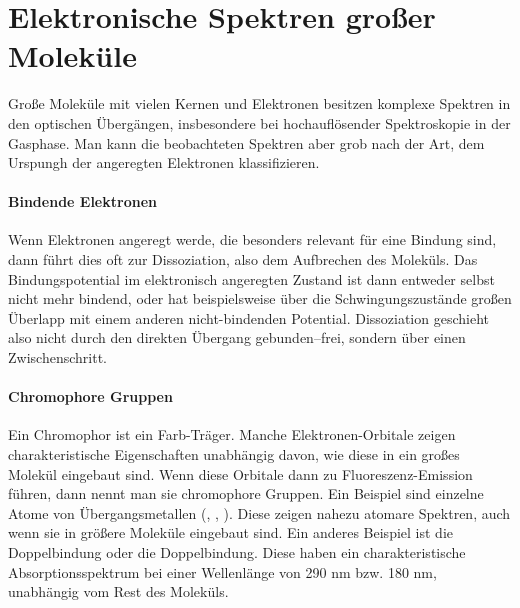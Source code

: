 
\section{Elektronische Spektren großer Moleküle}

Große Moleküle mit vielen Kernen und Elektronen besitzen komplexe Spektren in den optischen Übergängen, insbesondere bei hochauflösender Spektroskopie in der Gasphase. Man kann die beobachteten Spektren aber grob nach der Art, dem Urspungh der angeregten Elektronen klassifizieren.

\paragraph{Bindende Elektronen} Wenn Elektronen angeregt werde, die besonders relevant für eine Bindung sind, dann führt dies oft zur Dissoziation, also dem Aufbrechen des Moleküls. Das Bindungspotential im elektronisch angeregten Zustand ist dann entweder selbst nicht mehr bindend, oder hat beispielsweise über die Schwingungszustände großen Überlapp mit einem anderen nicht-bindenden Potential. Dissoziation geschieht also nicht durch den direkten Übergang gebunden--frei, sondern über einen Zwischenschritt.

\paragraph{Chromophore Gruppen} Ein Chromophor ist ein Farb-Träger. Manche Elektronen-Orbitale zeigen charakteristische Eigenschaften unabhängig davon, wie diese in ein großes Molekül eingebaut sind. Wenn diese Orbitale dann zu Fluoreszenz-Emission führen, dann nennt man sie chromophore Gruppen. Ein Beispiel sind einzelne Atome von Übergangsmetallen (, , ). Diese zeigen nahezu atomare Spektren, auch wenn sie in größere Moleküle eingebaut sind. Ein anderes Beispiel ist die  Doppelbindung oder die  Doppelbindung. Diese haben ein charakteristische Absorptionsspektrum bei einer Wellenlänge von 290 nm bzw. 180 nm, unabhängig vom Rest des Moleküls.

